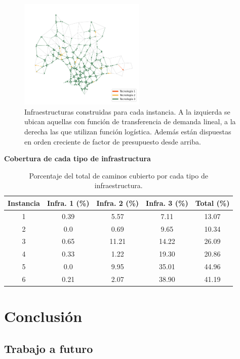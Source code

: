 \documentclass{article}
\begin{document}
\begin{figure}[h!]
    \includegraphics[width=6cm]{../resources/montevideo_d5000.0_inv_logit_1.6_budget_factor.png}
    \caption{Infraestructuras construidas para cada instancia. A la izquierda se ubican aquellas con función de transferencia de demanda lineal, a la derecha las que utilizan función logística. Además están dispuestas en orden creciente de factor de presupuesto desde arriba.}
    \label{fig:montevideo_instances_infras}
  \end{figure}


  \begin{table}[h!]
    \centering
    \caption*{{\bf Cobertura de cada tipo de infrastructura}}
    \begin{tabular}{ccccc}
      \toprule
        Instancia & Infra. 1 (\%) & Infra. 2 (\%) & Infra. 3 (\%) & Total (\%) \\
      \midrule
        1 & 0.39 & 5.57 & 7.11 & 13.07 \\
        2 & 0.0  & 0.69 & 9.65 & 10.34 \\
        3 & 0.65 & 11.21 & 14.22 & 26.09 \\
        4 & 0.33 & 1.22 & 19.30 & 20.86 \\
        5 & 0.0  & 9.95 & 35.01 & 44.96 \\
        6 & 0.21 & 2.07 & 38.90 & 41.19 \\
      \bottomrule
    \end{tabular}
    \caption{Porcentaje del total de caminos cubierto por cada tipo de infraestructura.}
    \label{table:montevideoinfracoverage}
  \end{table}

  \section{Conclusión}

  \subsection{Trabajo a futuro}
\end{document}
